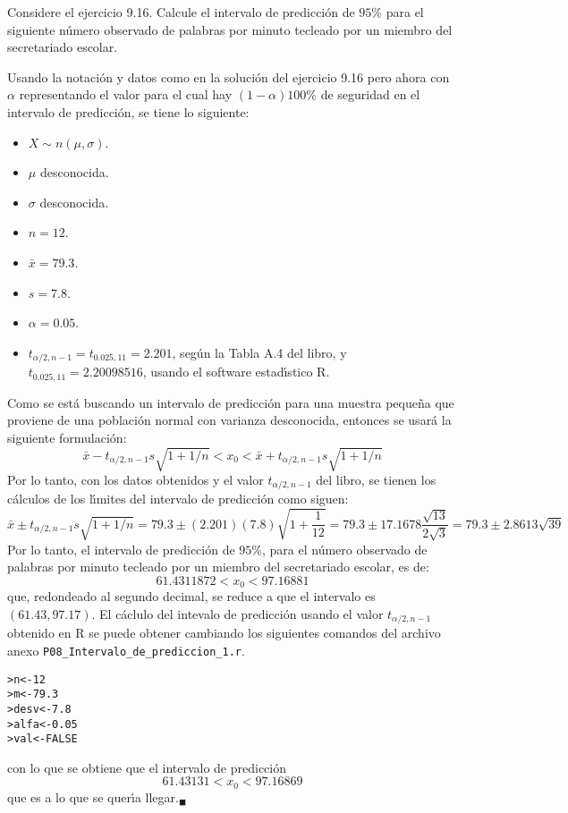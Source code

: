 \begin{enunciado}
 Considere el ejercicio 9.16. Calcule el intervalo de predicci\'on de $95\%$ para el siguiente n\'umero observado de palabras por minuto tecleado por un miembro del secretariado escolar.
\end{enunciado}

\begin{solucion}
 Usando la notaci\'on y datos como en la soluci\'on del ejercicio 9.16 pero ahora con $\alpha$ representando el valor para el cual hay $(1-\alpha)100\%$ de seguridad en el intervalo de predicci\'on, se tiene lo siguiente:
 \begin{itemize}
  \item $X\sim n(\mu,\sigma)$.
  \item $\mu$ desconocida.
  \item $\sigma$ desconocida.
  \item $n=12$.
  \item $\bar{x}=79.3$.
  \item $s=7.8$.
  \item $\alpha=0.05$.
  \item $t_{\alpha/2,n-1} = t_{0.025,11} = 2.201$, seg\'un la Tabla A.4 del libro, y $t_{0.025,11} = 2.20098516$, usando el software estad\'{\i}stico R.
 \end{itemize}
 Como se est\'a buscando un intervalo de predicci\'on para una muestra peque\~na que proviene de una poblaci\'on normal con varianza desconocida, entonces se usar\'a la siguiente formulaci\'on:
 \begin{equation*}
  \bar{x} - t_{\alpha/2,n-1}s\sqrt{1+1/n} < x_0 < \bar{x} + t_{\alpha/2,n-1}s\sqrt{1+1/n}
 \end{equation*}
 Por lo tanto, con los datos obtenidos y el valor $t_{\alpha/2,n-1}$ del libro, se tienen los c\'alculos de los l\'{\i}mites del intervalo de predicci\'on como siguen:
 \begin{equation*}
  \bar{x} \pm t_{\alpha/2,n-1}s\sqrt{1+1/n} = 79.3 \pm (2.201)(7.8)\sqrt{1+\frac{1}{12}} = 79.3 \pm 17.1678\frac{\sqrt{13}}{2\sqrt{3}} = 79.3 \pm  2.8613\sqrt{39}
 \end{equation*}
 Por lo tanto, el intervalo de predicci\'on de $95\%$, para el n\'umero observado de palabras por minuto tecleado por un miembro del secretariado escolar, es de:
 \begin{equation*}
  61.4311872 < x_0 < 97.16881
 \end{equation*}
 que, redondeado al segundo decimal, se reduce a que el intervalo es $(61.43, 97.17)$. El c\'aclulo del intevalo de predicci\'on usando el valor $t_{\alpha/2,n-1}$ obtenido en R se puede obtener cambiando los siguientes comandos del archivo anexo \texttt{P08\_Intervalo\_de\_prediccion\_1.r}.
 \begin{verbatim}
>n<-12
>m<-79.3
>desv<-7.8
>alfa<-0.05
>val<-FALSE
 \end{verbatim}
 \vspace{-0.5cm}
 con lo que se obtiene que el intervalo de predicci\'on
 \begin{equation*}
  61.43131 < x_0 < 97.16869
 \end{equation*}
 que es a lo que se quer\'{\i}a llegar.${}_{\blacksquare}$
\end{solucion}
